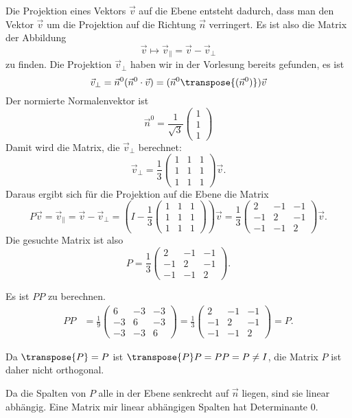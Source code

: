 \begin{loesung}
\begin{teilaufgaben}
\item
Die Projektion eines Vektors $\vec v$ auf die Ebene entsteht dadurch, dass man
den Vektor $\vec v$ um die Projektion auf die Richtung $\vec n$ verringert.
Es ist also die Matrix der Abbildung
\[
\vec v\mapsto \vec v_{\|} = \vec v - \vec v_{\perp}
\]
zu finden.
Die Projektion $\vec v_{\perp}$ haben wir in der Vorlesung bereits gefunden, es ist
\[
\vec v_{\perp}
=
\vec n^0
(\vec n^0\cdot \vec v)
=
(\vec n^0\transpose{(\vec n^0)})\vec v
\]
Der normierte Normalenvektor ist
\[
\vec n^0 =\frac1{\sqrt{3}}\begin{pmatrix}1\\1\\1\end{pmatrix}
\]
Damit wird die Matrix, die $\vec v_{\perp}$ berechnet:
\[
\vec v_{\perp}
=
\frac13\begin{pmatrix}
1&1&1\\
1&1&1\\
1&1&1
\end{pmatrix}
\vec v.
\]
Daraus ergibt sich für die Projektion auf die Ebene die Matrix
\[
P\vec v
=
\vec v_{\|}
=
\vec v-\vec v_{\perp}
=
\left(I-
\frac13\begin{pmatrix}
1&1&1\\
1&1&1\\
1&1&1
\end{pmatrix}\right)
\vec v
=
\frac13
\begin{pmatrix}
 2&-1&-1\\
-1& 2&-1\\
-1&-1& 2
\end{pmatrix}
\vec v.
\]
Die gesuchte Matrix ist also
\[
P=
\frac13
\begin{pmatrix}
 2&-1&-1\\
-1& 2&-1\\
-1&-1& 2
\end{pmatrix}.
\]
\item
Es ist $PP$ zu berechnen.
\begin{align*}
PP
&=
\frac19
\begin{pmatrix}
 6&-3&-3\\
-3& 6&-3\\
-3&-3& 6
\end{pmatrix}
=
\frac13
\begin{pmatrix}
 2&-1&-1\\
-1& 2&-1\\
-1&-1& 2
\end{pmatrix}
=P.
\end{align*}
\item
Da $\transpose{P}=P$ ist $\transpose{P}P=PP=P\ne I$, die Matrix $P$ ist daher nicht
orthogonal.
\item
Da die Spalten von $P$ alle in der Ebene senkrecht auf $\vec n$ liegen,
sind sie linear abhängig. 
Eine Matrix mir linear abhängigen Spalten hat Determinante $0$.
\end{teilaufgaben}
\end{loesung}

